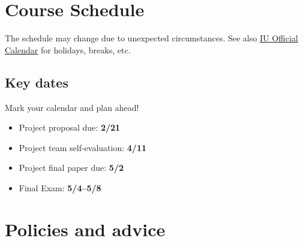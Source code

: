 \documentclass[11pt,article,oneside]{memoir} %
\begin{document}
\section{Course Schedule} %

The schedule may change due to unexpected circumstances. See also \href{https://registrar.indiana.edu/official-calendar/index.shtml}{IU Official Calendar} for holidays, breaks, etc. 

\subsection{Key dates}\label{sub:key_dates} %

Mark your calendar and plan ahead!

\vspace{-10pt}
\begin{itemize}\itemsep=0pt%
\item Project proposal due: \textbf{2/21}
\item Project team self-evaluation: \textbf{4/11}
\item Project final paper due: \textbf{5/2}
\item Final Exam: \textbf{5/4--5/8}
\end{itemize} %





\section{Policies and advice} %
\end{document}
